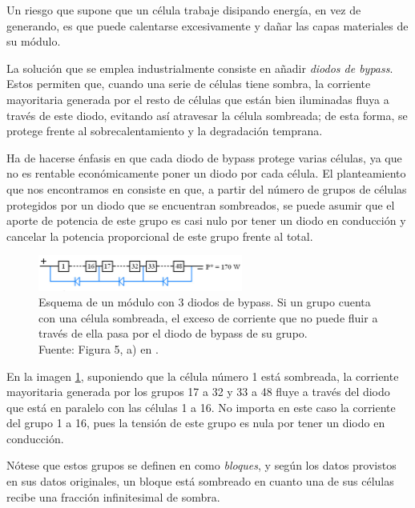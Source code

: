 Un riesgo que supone que un célula trabaje disipando energía, en vez de generando, es que puede calentarse excesivamente y dañar las capas materiales de su \gls{módulo}.

La solución que se emplea industrialmente consiste en añadir \textit{diodos de bypass}. Estos permiten que, cuando una serie de células tiene \gls{sombra}, la corriente mayoritaria generada por el resto de células que están bien iluminadas fluya a través de este diodo, evitando así atravesar la célula sombreada; de esta forma, se protege frente al sobrecalentamiento y la degradación temprana.

Ha de hacerse énfasis en que cada diodo de bypass protege varias células, ya que no es rentable económicamente poner un diodo por cada célula. El planteamiento que nos encontramos en \cite{Martínez-Moreno_Muñoz_Lorenzo_2010} consiste en que, a partir del número de grupos de células protegidos por un diodo que se encuentran sombreados, se puede asumir que el aporte de potencia de este grupo es casi nulo por tener un diodo en conducción y cancelar la potencia proporcional de este grupo frente al total.

\begin{figure}[H]
    \centering
    \includegraphics[width=0.6\textwidth]{./images/bypass_diodes/bypass_diodes.png}
    \caption{Esquema de un módulo con 3 \gls{diodos de bypass}. Si un grupo cuenta con una célula sombreada, el exceso de corriente que no puede fluir a través de ella pasa por el diodo de bypass de su grupo.\\Fuente: Figura 5, a) en \cite{Martínez-Moreno_Muñoz_Lorenzo_2010}.}
    \label{fig:diodos_bypass}
\end{figure}

En la imagen \ref{fig:diodos_bypass}, suponiendo que la célula número 1 está sombreada, la corriente mayoritaria generada por los grupos 17 a 32 y 33 a 48 fluye a través del diodo que está en paralelo con las células 1 a 16. No importa en este caso la corriente del grupo 1 a 16, pues la tensión de este grupo es nula por tener un diodo en conducción.

Nótese que estos grupos se definen en \cite{Martínez-Moreno_Muñoz_Lorenzo_2010} como \textit{bloques}, y según los datos provistos en sus datos originales, un bloque está sombreado en cuanto una de sus células recibe una fracción infinitesimal de \gls{sombra}.

